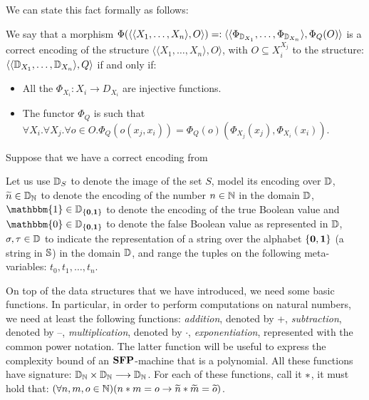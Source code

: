 \begin{conditional}{\appendixorsup}
  We can state this fact formally as follows:

  \begin{defn}
    We say that a morphism $\Phi(\langle \langle X_1, \ldots, X_n\rangle, O\rangle)=:
    \langle \langle \Phi_{\mathbb{D}_{X_1}}, \ldots, \Phi_{\mathbb{D}_{X_n}}\rangle, \Phi_{Q}(O)\rangle$
    is a correct encoding of the structure
     $\langle \langle X_1, \ldots, X_n\rangle, O\rangle$, with
     $O\subseteq X_i^{X_j}$ to the structure:
     $\langle \langle \mathbb{D}_{X_1}, \ldots, \mathbb{D}_{X_n}\rangle, Q\rangle$ if and only if:
     \begin{itemize}
       \item All the $\Phi_{X_i}: X_i \longrightarrow D_{X_i}$ are injective functions.
       \item The functor $\Phi_Q$ is such that $\forall X_i.\forall X_j.
       \forall o \in O. \Phi_Q(o(x_j, x_i))= \Phi_{Q}(o)(\Phi_{X_j}(x_j),
        \Phi_{X_i}(x_i))$.
     \end{itemize}
  \end{defn}

  Suppose that we have a correct encoding from

  \begin{notation}
  Let us use $\mathbb{D}_S$ to denote the image of the set $S$,
  model its encoding over $\mathbb{D}$,
  {$\widetilde{n} \in \mathbb{D}_{\mathbb{N}}$
  to denote the encoding of the number $n\in \mathbb{N}$
  in the domain $\mathbb{D}$,
  $\mathbbm{1} \in \Dd_{\{\zzero,\oone\}}$
  to denote the encoding of the true Boolean value
  and $\mathbbm{0} \in \Dd_{\{\zzero,\oone\}}$ to denote
  the false Boolean value as represented
  in $\mathbb{D}$,}
  $\sigma,\tau\in \mathbb{D}$ to indicate
  the representation of a string over the
  alphabet $\{\mathbf{0},\mathbf{1}\}$ (a string in
  $\mathbb{S}$) in the domain $\mathbb{D}$,
  and range the tuples on the following
  meta-variables: $t_0,t_1,\dots, t_n$.
  \end{notation}
  \noindent
  On top of the data structures
  that we have introduced,
  we need some basic functions.
  In particular, in order
  to perform computations on
  natural numbers,
  we need at least the following functions:
  \emph{addition}, denoted by  +,
  \emph{subtraction}, denoted by –,
  \emph{multiplication}, denoted by {$\cdot$},
  \emph{exponentiation}, represented with the
  common power notation.
  The latter function will be useful to express
  the complexity bound of an $\mathbf{SFP}$-machine
  that is a polynomial.
  All these functions have signature: $\mathbb{D}_{\mathbb{N}}\times
  \mathbb{D}_{\mathbb{N}} \longrightarrow \mathbb{D}_{\mathbb{N}}$.
  {For each of these functions,
  call it $*$,
  it must hold that: $(\forall n,m,o\in \mathbb{N})(
  n* m=o \rightarrow \widetilde{n} * \widetilde{m}
  =\widetilde{o})$}.


\end{conditional}
